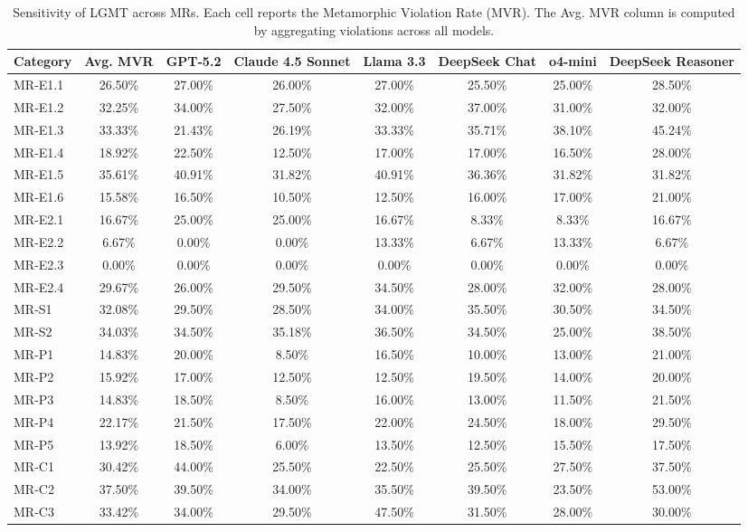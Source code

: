\begin{table}[pos=htbp]
\centering
\caption{Sensitivity of LGMT across MRs. Each cell reports the Metamorphic Violation Rate (MVR). The Avg. MVR column is computed by aggregating violations across all models.}\label{tab:rq3_appendix}
\begin{tabular}{lccccccc}
\toprule
Category & Avg. MVR & GPT-5.2 & Claude 4.5 Sonnet & Llama 3.3 & DeepSeek Chat & o4-mini & DeepSeek Reasoner \\
\midrule
MR-E1.1 & 26.50\% & 27.00\% & 26.00\% & 27.00\% & 25.50\% & 25.00\% & 28.50\% \\
MR-E1.2 & 32.25\% & 34.00\% & 27.50\% & 32.00\% & 37.00\% & 31.00\% & 32.00\% \\
MR-E1.3 & 33.33\% & 21.43\% & 26.19\% & 33.33\% & 35.71\% & 38.10\% & 45.24\% \\
MR-E1.4 & 18.92\% & 22.50\% & 12.50\% & 17.00\% & 17.00\% & 16.50\% & 28.00\% \\
MR-E1.5 & 35.61\% & 40.91\% & 31.82\% & 40.91\% & 36.36\% & 31.82\% & 31.82\% \\
MR-E1.6 & 15.58\% & 16.50\% & 10.50\% & 12.50\% & 16.00\% & 17.00\% & 21.00\% \\
MR-E2.1 & 16.67\% & 25.00\% & 25.00\% & 16.67\% & 8.33\% & 8.33\% & 16.67\% \\
MR-E2.2 & 6.67\% & 0.00\% & 0.00\% & 13.33\% & 6.67\% & 13.33\% & 6.67\% \\
MR-E2.3 & 0.00\% & 0.00\% & 0.00\% & 0.00\% & 0.00\% & 0.00\% & 0.00\% \\
MR-E2.4 & 29.67\% & 26.00\% & 29.50\% & 34.50\% & 28.00\% & 32.00\% & 28.00\% \\
MR-S1 & 32.08\% & 29.50\% & 28.50\% & 34.00\% & 35.50\% & 30.50\% & 34.50\% \\
MR-S2 & 34.03\% & 34.50\% & 35.18\% & 36.50\% & 34.50\% & 25.00\% & 38.50\% \\
MR-P1 & 14.83\% & 20.00\% & 8.50\% & 16.50\% & 10.00\% & 13.00\% & 21.00\% \\
MR-P2 & 15.92\% & 17.00\% & 12.50\% & 12.50\% & 19.50\% & 14.00\% & 20.00\% \\
MR-P3 & 14.83\% & 18.50\% & 8.50\% & 16.00\% & 13.00\% & 11.50\% & 21.50\% \\
MR-P4 & 22.17\% & 21.50\% & 17.50\% & 22.00\% & 24.50\% & 18.00\% & 29.50\% \\
MR-P5 & 13.92\% & 18.50\% & 6.00\% & 13.50\% & 12.50\% & 15.50\% & 17.50\% \\
MR-C1 & 30.42\% & 44.00\% & 25.50\% & 22.50\% & 25.50\% & 27.50\% & 37.50\% \\
MR-C2 & 37.50\% & 39.50\% & 34.00\% & 35.50\% & 39.50\% & 23.50\% & 53.00\% \\
MR-C3 & 33.42\% & 34.00\% & 29.50\% & 47.50\% & 31.50\% & 28.00\% & 30.00\% \\
\bottomrule
\end{tabular}
\end{table}